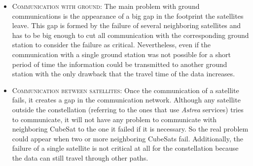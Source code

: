 \begin{itemize}
\item \textsc{Communication with ground:}
The main problem with ground communications is the appearance of a big gap in the footprint the satellites leave. This gap is formed by the failure of several neighboring satellites and has to be big enough to cut all communication with the corresponding ground station to consider the failure as critical. Nevertheless, even if the communication with a single ground station was not possible for a short period of time the information could be transmitted to another ground station with the only drawback that the travel time of the data increases.   
\item \textsc{Communication between satellites:}
Once the communication of a satellite fails, it creates a gap in the communication network. Although any satellite outside the constellation (referring to the ones that use \textit{Astrea} services) tries to communicate, it will not have any problem to communicate with neighboring CubeSat to the one it failed if it is necessary. So the real problem could appear when two or more neighboring CubeSats fail. Additionally, the failure of a single satellite is not critical at all for the constellation because the data can still travel through other paths. 

\end{itemize}

 